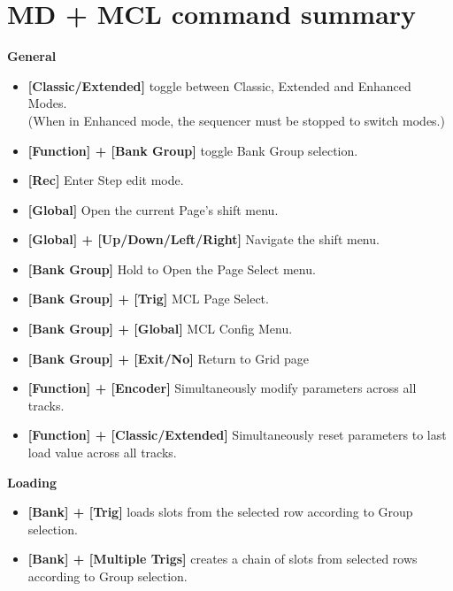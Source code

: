 \section{MD + MCL command summary}

\textbf{General}
   \begin{itemize}
      \item \textbf{[Classic/Extended] } toggle between Classic, Extended and Enhanced Modes.\\(When in Enhanced mode, the sequencer must be stopped to switch modes.)
      \item \textbf{[Function] + [Bank Group]} toggle Bank Group selection.
      \item \textbf{[Rec]} Enter Step edit mode.
      \item \textbf{[Global]} Open the current Page's shift menu.
      \item \textbf{[Global] + [Up/Down/Left/Right]} Navigate the shift menu.
      \item \textbf{[Bank Group]} Hold to Open the Page Select menu.
      \item \textbf{[Bank Group] + [Trig]} MCL Page Select.
      \item \textbf{[Bank Group] + [Global]} MCL Config Menu. 
      \item \textbf{[Bank Group] + [Exit/No]} Return to Grid page
      \item \textbf{[Function] + [Encoder]} Simultaneously modify parameters across all tracks. 
       \item \textbf{[Function] + [Classic/Extended]} Simultaneously reset parameters to last load value across all tracks.
 \end{itemize}
 
\textbf{Loading}
   \begin{itemize}
      \item \textbf{[Bank] + [Trig]} loads slots from the selected row according to Group selection.
      \item \textbf{[Bank] + [Multiple Trigs]} creates a chain of slots from selected rows according to Group selection.
   \end{itemize}

